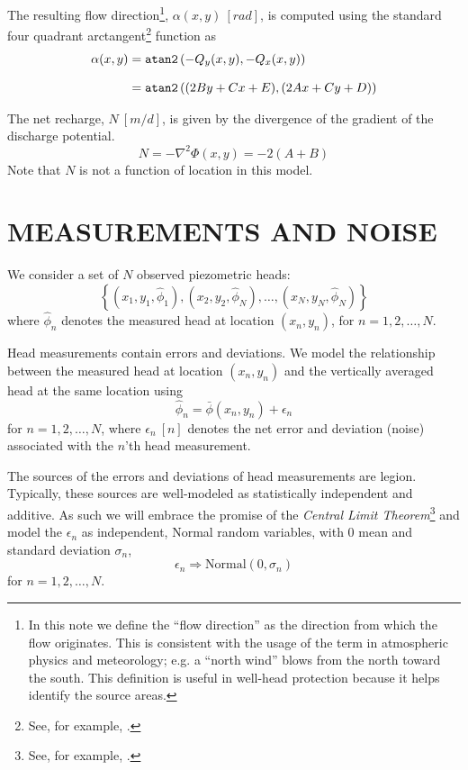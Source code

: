 \documentclass[12pt]{report}
\begin{document}
The resulting flow direction\footnote{In this note we define the ``flow direction'' as the direction from which the flow originates. This is consistent with the usage of the term in atmospheric physics and meteorology; e.g. a ``north wind'' blows from the north toward the south.  This definition is useful in well-head protection because it helps identify the source areas.}, $\alpha(x,y)~[rad]$, is computed using the standard four quadrant arctangent\footnote{See, for example, \cite{wiki:atan2}.} function as
%
\begin{align}\label{3.0.11}
    \alpha(x,y)
    &= \text{\tt atan2}\left(-Q_y(x,y), -Q_x(x,y)\right) \nonumber\\[8pt]
    &= \text{\tt atan2}\left((2By + Cx + E), (2Ax + Cy + D)\right)
\end{align}

The net recharge, $N~[m/d]$, is given by the divergence of the gradient of the discharge potential.
%
\begin{equation}\label{3.0.12}
    N = -\nabla^2 \Phi(x,y) = -2(A+B)
\end{equation}
%
Note that $N$ is not a function of location in this model.


\chapter{MEASUREMENTS AND NOISE}
We consider a set of $N$ observed piezometric heads:
%
\begin{equation}\label{4.0.1}
	\left\{ (x_1,y_1,\hat{\phi}_1), (x_2,y_2,\hat{\phi}_N), \ldots, (x_N,y_N,\hat{\phi}_N) \right\}
\end{equation}
%
where $\hat{\phi}_n$ denotes the measured head at location $(x_n,y_n)$, for $n = 1, 2, \ldots, N$.

Head measurements contain errors and deviations.  We model the relationship between the measured head at location $(x_n, y_n)$ and the vertically averaged head at the same location using
%
\begin{equation}\label{4.0.2}
	\hat{\phi}_n = \bar{\phi}(x_n, y_n) + \epsilon_n
\end{equation}
%
for $n = 1, 2, \ldots, N$, where $\epsilon_n~[n]$ denotes the net error and deviation (noise) associated with the $n$'th head measurement.

The sources of the errors and deviations of head measurements are legion.  Typically, these sources are well-modeled as statistically independent and additive.  As such we will embrace the promise of the {\em Central Limit Theorem}\footnote{See, for example, \citet{wiki:clt}.} and model the $\epsilon_n$ as independent, Normal random variables, with $0$ mean and standard deviation $\sigma_n$,
%
\begin{equation}\label{4.0.3}
    \epsilon_n \Rightarrow \text{Normal}(0, \sigma_n)
\end{equation}
%
for $n=1,2,\ldots,N$.
\end{document}
